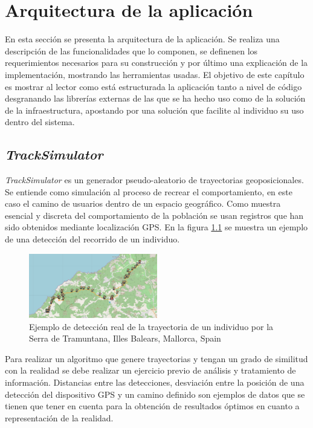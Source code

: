 
\chapter{Arquitectura de la aplicación}

En esta sección se presenta la arquitectura de la aplicación. Se realiza una 
descripción de las funcionalidades que lo componen, se definenen los requerimientos necesarios 
para su construcción y por último una explicación de la implementación, mostrando las herramientas 
usadas. El objetivo de este capítulo es mostrar al lector como está estructurada la aplicación tanto a nivel
de código desgranando las librerías externas de las que se ha hecho uso como de la solución de la 
infraestructura, apostando por una solución que facilite al individuo su uso dentro del sistema.

\section{\textit{TrackSimulator}}
\textit{TrackSimulator} es un generador pseudo-aleatorio de trayectorias geoposicionales. Se entiende como 
simulación al proceso de recrear el comportamiento, en este caso el camino de usuarios dentro de un espacio 
geográfico. Como muestra esencial y discreta del comportamiento de la población se usan registros que han 
sido obtenidos mediante localización \ac{GPS}. En la figura \ref{figure:TrackExample1} se muestra un ejemplo 
de una detección del recorrido de un individuo.
\begin{figure}[!htb]
\begin{center}
\includegraphics[width=0.5\textwidth]{./Imagenes/RealTrackDetection.png}
\caption{Ejemplo de detección real de la trayectoria de un individuo por la Serra de Tramuntana, Illes 
Balears, Mallorca, Spain}
\label{figure:TrackExample1}
\end{center}
\end{figure}
\newpage

Para realizar un algoritmo que genere trayectorias y tengan un grado de similitud con la realidad se debe 
realizar un ejercicio previo de análisis y tratamiento de información. Distancias entre las detecciones, 
desviación entre la posición de una detección del dispositivo \ac{GPS} y un camino definido son ejemplos de 
datos que se tienen que tener en cuenta para la obtención de resultados óptimos en cuanto a representación 
de la realidad.

